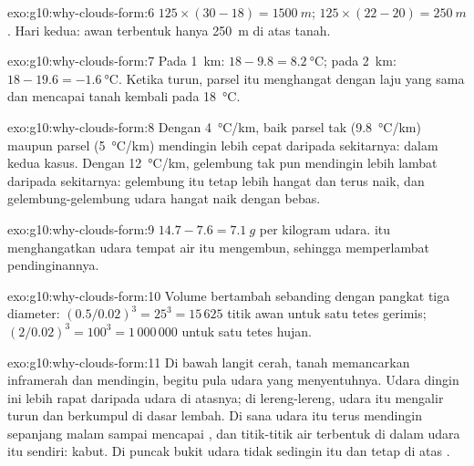 \begin{solution}{exo:g10:why-clouds-form:6}
$125 \times (30 - 18) = \qty{1500}{m}$; $125 \times (22 - 20) =
\qty{250}{m}$. Hari kedua: awan terbentuk hanya \qty{250}{m} di atas
tanah.
\end{solution}

\begin{solution}{exo:g10:why-clouds-form:7}
Pada \qty{1}{km}: $18 - 9.8 = \qty{8.2}{\degreeCelsius}$; pada \qty{2}{km}:
$18 - 19.6 = \qty{-1.6}{\degreeCelsius}$. Ketika turun, parsel itu menghangat
dengan laju yang sama dan mencapai tanah kembali pada \qty{18}{\degreeCelsius}.
\end{solution}

\begin{solution}{exo:g10:why-clouds-form:8}
Dengan \qty{4}{\degreeCelsius/km}, baik parsel tak 
(\qty{9.8}{\degreeCelsius/km}) maupun parsel 
(\qty{5}{\degreeCelsius/km}) mendingin lebih cepat daripada sekitarnya: 
dalam kedua kasus. Dengan \qty{12}{\degreeCelsius/km}, gelembung tak  pun
mendingin lebih lambat daripada sekitarnya: gelembung itu tetap lebih hangat
dan terus naik, dan gelembung-gelembung udara hangat naik dengan bebas.
\end{solution}

\begin{solution}{exo:g10:why-clouds-form:9}
$14.7 - 7.6 = \qty{7.1}{g}$ per kilogram udara.  itu menghangatkan
udara tempat air itu mengembun, sehingga memperlambat pendinginannya.
\end{solution}

\begin{solution}{exo:g10:why-clouds-form:10}
Volume bertambah sebanding dengan pangkat tiga diameter:
$(0.5/0.02)^3 = 25^3 = 15\,625$ titik awan untuk satu tetes gerimis;
$(2/0.02)^3 = 100^3 = 1\,000\,000$ untuk satu tetes hujan.
\end{solution}

\begin{solution}{exo:g10:why-clouds-form:11}
Di bawah langit cerah, tanah memancarkan inframerah dan mendingin, begitu pula
udara yang menyentuhnya. Udara dingin ini lebih rapat daripada udara di
atasnya; di lereng-lereng, udara itu mengalir turun dan berkumpul di dasar
lembah. Di sana udara itu terus mendingin sepanjang malam sampai mencapai
, dan titik-titik air terbentuk di dalam udara itu sendiri:
kabut. Di puncak bukit udara tidak sedingin itu dan tetap di atas .
\end{solution}

